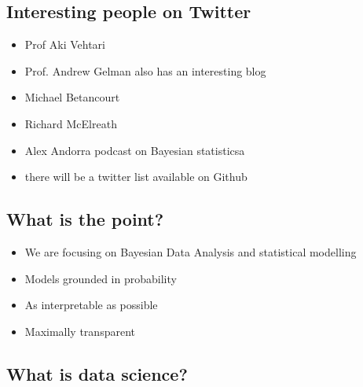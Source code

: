 \documentclass[letterpaper,10pt,english]{jupyterBook}
\begin{document}
\subsection{Interesting people on Twitter}
\label{\detokenize{Lecture 1:interesting-people-on-twitter}}\begin{itemize}
\item {} 
\sphinxAtStartPar
Prof Aki Vehtari 

\item {} 
\sphinxAtStartPar
Prof. Andrew Gelman  \sphinxhyphen{} also has an interesting blog

\item {} 
\sphinxAtStartPar
Michael Betancourt 

\item {} 
\sphinxAtStartPar
Richard McElreath 

\item {} 
\sphinxAtStartPar
Alex Andorra  \sphinxhyphen{} podcast on Bayesian statisticsa

\item {} 
\sphinxAtStartPar
there will be a twitter list available on Github

\end{itemize}


\subsection{What is the point?}
\label{\detokenize{Lecture 1:what-is-the-point}}\begin{itemize}
\item {} 
\sphinxAtStartPar
We are focusing on Bayesian Data Analysis and statistical modelling

\item {} 
\sphinxAtStartPar
Models grounded in probability

\item {} 
\sphinxAtStartPar
As interpretable as possible

\item {} 
\sphinxAtStartPar
Maximally transparent

\end{itemize}


\subsection{What is data science?}
\label{\detokenize{Lecture 1:what-is-data-science}}
\end{document}
